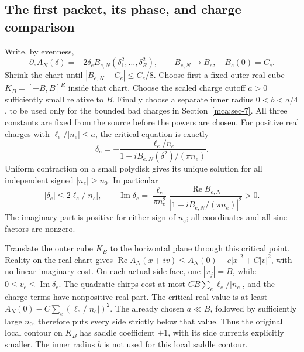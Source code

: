 \subsection{The first packet, its phase, and charge
comparison}\label{mca:sec-6}

Write, by evenness, \begin{equation}\label{mca:eq-15}
\partial_e A_N(\delta)=-2\delta_e B_{e,N}(\delta_1^2,\ldots,\delta_R^2),
 \qquad B_{e,N}\longrightarrow B_e,\quad B_e(0)=C_e.
\end{equation} Shrink the chart until \(|B_{e,N}-C_e|\le C_e/8\). Choose first a
fixed outer real cube \(K_B=[-B,B]^R\) inside that chart. Choose the
scaled charge cutoff \(a>0\) sufficiently small relative to \(B\).
Finally choose a separate inner radius \(0<b<a/4\), to be used only for
the bounded bad charges in Section~\ref{mca:sec-7}. All
three constants are fixed from the source before the powers are chosen.
For positive real charges with \(\ell_e/|n_e|\le a\), the critical
equation is exactly \begin{equation}\label{mca:eq-16}
\delta_e=-\frac{\ell_e/n_e}
                  {1+i B_{e,N}(\delta^2)/(\pi n_e)}.
\end{equation} Uniform contraction on a small polydisk gives its unique solution for
all independent signed \(|n_e|\ge n_0\). In particular \begin{equation}\label{mca:eq-17}
|\delta_e|\le2\ell_e/|n_e|,\qquad
 \operatorname{Im}\delta_e=
 \frac{\ell_e}{\pi n_e^2}
 \frac{\operatorname{Re}B_{e,N}}
 {|1+iB_{e,N}/(\pi n_e)|^2}>0.
\end{equation} The imaginary part is positive for either sign of \(n_e\); all
coordinates and all sine factors are nonzero.

Translate the outer cube \(K_B\) to the horizontal plane through this
critical point. Reality on the real chart gives
\(\operatorname{Re}A_N(x+iv)\le A_N(0)-c|x|^2+C|v|^2\), with no linear
imaginary cost. On each actual side face, one \(|x_j|=B\), while
\(0\le v_e\le\operatorname{Im}\delta_e\). The quadratic chirps cost at
most \(CB\sum_e\ell_e/|n_e|\), and the charge terms have nonpositive
real part. The critical real value is at least
\(A_N(0)-C\sum_e(\ell_e/|n_e|)^2\). The already chosen \(a\ll B\),
followed by sufficiently large \(n_0\), therefore puts every side
strictly below that value. Thus the original local contour on \(K_B\)
has saddle coefficient \(+1\), with its side currents explicitly
smaller. The inner radius \(b\) is not used for this local saddle
contour.

